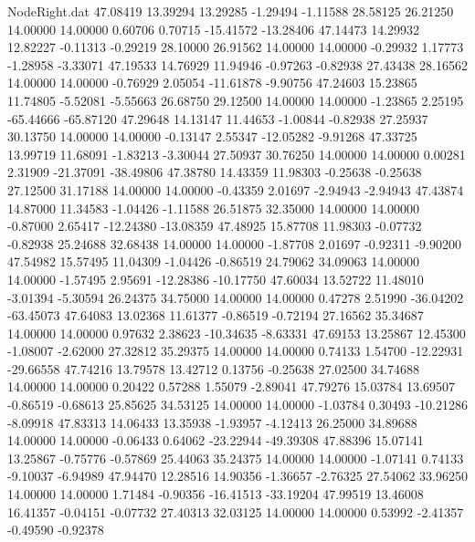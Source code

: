 \begin{filecontents}{NodeRight.dat}
  47.08419   13.39294   13.29285    -1.29494   -1.11588   28.58125   26.21250   14.00000   14.00000    0.60706    0.70715  -15.41572  -13.28406
  47.14473   14.29932   12.82227    -0.11313   -0.29219   28.10000   26.91562   14.00000   14.00000   -0.29932    1.17773   -1.28958   -3.33071
  47.19533   14.76929   11.94946    -0.97263   -0.82938   27.43438   28.16562   14.00000   14.00000   -0.76929    2.05054  -11.61878   -9.90756
  47.24603   15.23865   11.74805    -5.52081   -5.55663   26.68750   29.12500   14.00000   14.00000   -1.23865    2.25195  -65.44666  -65.87120
  47.29648   14.13147   11.44653    -1.00844   -0.82938   27.25937   30.13750   14.00000   14.00000   -0.13147    2.55347  -12.05282   -9.91268
  47.33725   13.99719   11.68091    -1.83213   -3.30044   27.50937   30.76250   14.00000   14.00000    0.00281    2.31909  -21.37091  -38.49806
  47.38780   14.43359   11.98303    -0.25638   -0.25638   27.12500   31.17188   14.00000   14.00000   -0.43359    2.01697   -2.94943   -2.94943
  47.43874   14.87000   11.34583    -1.04426   -1.11588   26.51875   32.35000   14.00000   14.00000   -0.87000    2.65417  -12.24380  -13.08359
  47.48925   15.87708   11.98303    -0.07732   -0.82938   25.24688   32.68438   14.00000   14.00000   -1.87708    2.01697   -0.92311   -9.90200
  47.54982   15.57495   11.04309    -1.04426   -0.86519   24.79062   34.09063   14.00000   14.00000   -1.57495    2.95691  -12.28386  -10.17750
  47.60034   13.52722   11.48010    -3.01394   -5.30594   26.24375   34.75000   14.00000   14.00000    0.47278    2.51990  -36.04202  -63.45073
  47.64083   13.02368   11.61377    -0.86519   -0.72194   27.16562   35.34687   14.00000   14.00000    0.97632    2.38623  -10.34635   -8.63331
  47.69153   13.25867   12.45300    -1.08007   -2.62000   27.32812   35.29375   14.00000   14.00000    0.74133    1.54700  -12.22931  -29.66558
  47.74216   13.79578   13.42712     0.13756   -0.25638   27.02500   34.74688   14.00000   14.00000    0.20422    0.57288    1.55079   -2.89041
  47.79276   15.03784   13.69507    -0.86519   -0.68613   25.85625   34.53125   14.00000   14.00000   -1.03784    0.30493  -10.21286   -8.09918
  47.83313   14.06433   13.35938    -1.93957   -4.12413   26.25000   34.89688   14.00000   14.00000   -0.06433    0.64062  -23.22944  -49.39308
  47.88396   15.07141   13.25867    -0.75776   -0.57869   25.44063   35.24375   14.00000   14.00000   -1.07141    0.74133   -9.10037   -6.94989
  47.94470   12.28516   14.90356    -1.36657   -2.76325   27.54062   33.96250   14.00000   14.00000    1.71484   -0.90356  -16.41513  -33.19204
  47.99519   13.46008   16.41357    -0.04151   -0.07732   27.40313   32.03125   14.00000   14.00000    0.53992   -2.41357   -0.49590   -0.92378

\end{filecontents}
